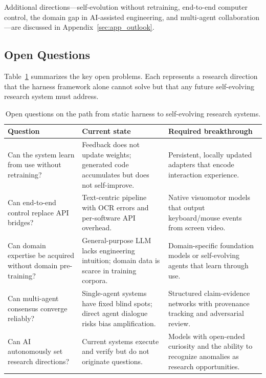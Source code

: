 \documentclass{article}
\begin{document}
Additional directions---self-evolution without retraining, end-to-end computer control, the domain gap in AI-assisted engineering, and multi-agent collaboration---are discussed in Appendix~\ref{sec:app_outlook}.

\subsection{Open Questions}

Table~\ref{tab:open_questions} summarizes the key open problems. Each represents a research direction that the harness framework alone cannot solve but that any future self-evolving research system must address.

\begin{table}[h]
\centering
\caption{Open questions on the path from static harness to self-evolving research systems.}
\begin{tabular}{p{4.8cm}p{4.8cm}p{4.8cm}}
\toprule
\textbf{Question} & \textbf{Current state} & \textbf{Required breakthrough} \\
\midrule
Can the system learn from use without retraining? & Feedback does not update weights; generated code accumulates but does not self-improve. & Persistent, locally updated adapters that encode interaction experience. \\
Can end-to-end control replace API bridges? & Text-centric pipeline with OCR errors and per-software API overhead. & Native visuomotor models that output keyboard/mouse events from screen video. \\
Can domain expertise be acquired without domain pre-training? & General-purpose LLM lacks engineering intuition; domain data is scarce in training corpora. & Domain-specific foundation models or self-evolving agents that learn through use. \\
Can multi-agent consensus converge reliably? & Single-agent systems have fixed blind spots; direct agent dialogue risks bias amplification. & Structured claim-evidence networks with provenance tracking and adversarial review. \\
Can AI autonomously set research directions? & Current systems execute and verify but do not originate questions. & Models with open-ended curiosity and the ability to recognize anomalies as research opportunities. \\
\bottomrule
\end{tabular}
\label{tab:open_questions}
\end{table}
\end{document}
